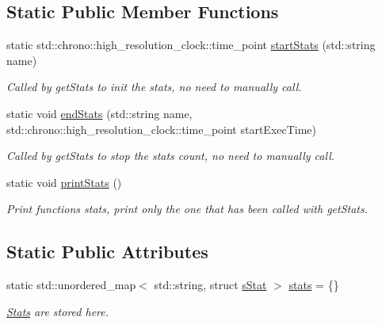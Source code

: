 \subsection*{Static Public Member Functions}
\begin{DoxyCompactItemize}
\item 
static std\+::chrono\+::high\+\_\+resolution\+\_\+clock\+::time\+\_\+point \hyperlink{class_stats_a4a300a5e0856dee0d136ac3828cd28bb}{start\+Stats} (std\+::string name)
\begin{DoxyCompactList}\small\item\em Called by get\+Stats to init the stats, no need to manually call. \end{DoxyCompactList}\item 
\mbox{\label{class_stats_abda60b41a2aebd705b4a7dbf3f3cc384}} 
static void \hyperlink{class_stats_abda60b41a2aebd705b4a7dbf3f3cc384}{end\+Stats} (std\+::string name, std\+::chrono\+::high\+\_\+resolution\+\_\+clock\+::time\+\_\+point start\+Exec\+Time)
\begin{DoxyCompactList}\small\item\em Called by get\+Stats to stop the stats count, no need to manually call. \end{DoxyCompactList}\item 
\mbox{\label{class_stats_ab11b92ed03af0b394839c19529e045b4}} 
static void \hyperlink{class_stats_ab11b92ed03af0b394839c19529e045b4}{print\+Stats} ()
\begin{DoxyCompactList}\small\item\em Print functions stats, print only the one that has been called with get\+Stats. \end{DoxyCompactList}\end{DoxyCompactItemize}
\subsection*{Static Public Attributes}
\begin{DoxyCompactItemize}
\item 
\mbox{\label{class_stats_abbdb294499c6a8ce43bcf41f996f7902}} 
static std\+::unordered\+\_\+map$<$ std\+::string, struct \hyperlink{structs_stat}{s\+Stat} $>$ \hyperlink{class_stats_abbdb294499c6a8ce43bcf41f996f7902}{stats} = \{\}
\begin{DoxyCompactList}\small\item\em \hyperlink{class_stats}{Stats} are stored here. \end{DoxyCompactList}\end{DoxyCompactItemize}


